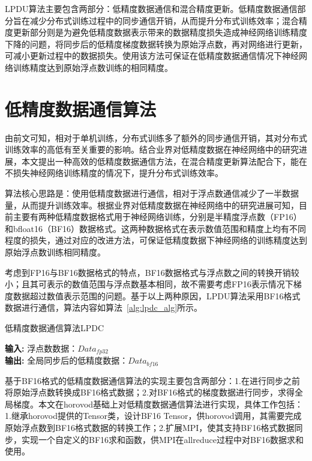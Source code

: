 LPDU算法主要包含两部分：低精度数据通信和混合精度更新。低精度数据通信部分旨在减少分布式训练过程中的同步通信开销，从而提升分布式训练效率；混合精度更新部分则是为避免低精度数据表示带来的数据精度损失造成神经网络训练精度下降的问题，将同步后的低精度梯度数据转换为原始浮点数，再对网络进行更新，可减小更新过程中的数据损失。使用该方法可保证在低精度数据通信情况下神经网络训练精度达到原始浮点数训练的相同精度。

\section{低精度数据通信算法}
由前文可知，相对于单机训练，分布式训练多了额外的同步通信开销，其对分布式训练效率的高低有至关重要的影响。结合业界对低精度数据在神经网络中的研究进展，本文提出一种高效的低精度数据通信方法，在混合精度更新算法配合下，能在不损失神经网络训练精度的情况下，提升分布式训练效率。

算法核心思路是：使用低精度数据进行通信，相对于浮点数通信减少了一半数据量，从而提升训练效率。根据业界对低精度数据在神经网络中的研究进展可知，目前主要有两种低精度数据格式用于神经网络训练，分别是半精度浮点数（FP16）和bfloat16（BF16）数据格式。这两种数据格式在表示数值范围和精度上均有不同程度的损失，通过对应的改进方法，可保证低精度数据下神经网络的训练精度达到原始浮点数训练相同精度。

考虑到FP16与BF16数据格式的特点，BF16数据格式与浮点数之间的转换开销较小；且其可表示的数值范围与浮点数基本相同，故不需要考虑FP16表示情况下梯度数据超过数值表示范围的问题。基于以上两种原因，LPDU算法采用BF16格式数据进行通信，算法内容如算法~\ref{alg:lpdc_alg}所示。

\begin{algorithm}\small
\caption{低精度数据通信算法LPDC}
\textbf{输入:}
浮点数数据：$Data_{fp32}$ \\
\textbf{输出:} 
全局同步后的低精度数据：$Data_{bf16}$
\begin{algorithmic}[1]
\end{algorithmic}
	\label{alg:lpdc_alg}
\end{algorithm}

基于BF16格式的低精度数据通信算法的实现主要包含两部分：1.在进行同步之前将原始浮点数转换成BF16格式数据；2.对BF16格式的梯度数据进行同步，求得全局梯度。本文在horovod基础上对低精度数据通信算法进行实现，具体工作包括：1.继承horovod提供的Tensor类，设计BF16 Tensor，供horovod调用，其需要完成原始浮点数到BF16格式数据的转换工作；2.扩展MPI，使其支持BF16格式数据同步，实现一个自定义的BF16求和函数，供MPI在allreduce过程中对BF16数据求和使用。

